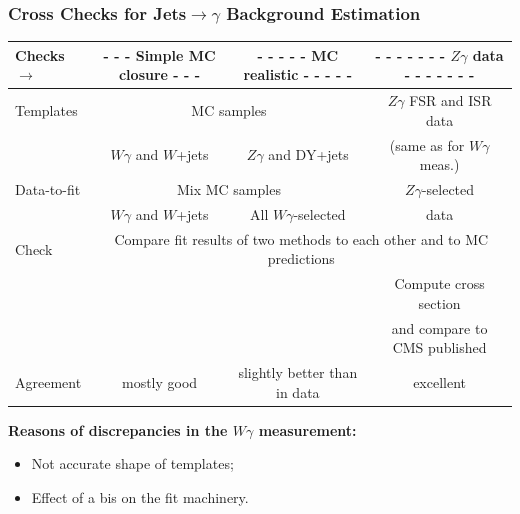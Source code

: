 \begin{frame}\frametitle {Cross Checks for Jets$\rightarrow\gamma$ Background Estimation}



\tiny

\begin{table}[h]
  \tiny
  \begin{center}
    \begin{tabular}{|l|c|c|c|}
      \hline
      Checks$\rightarrow$  & {\bfseries{- - - Simple MC closure - - -}} &  {\bfseries{- - - - - MC realistic - - - - -}}   & {\bfseries{- - - - - - - $Z\gamma$ data - - - - - - -}} \\ \hline

      Templates & \multicolumn{2}{|c|}{MC samples}                 &  $Z\gamma$ FSR and ISR data \\ 
                & $W\gamma$ and $W$+jets &  $Z\gamma$ and DY+jets  &  (same as for $W\gamma$ meas.) \\ \hline

      Data-to-fit & \multicolumn{2}{|c|}{Mix MC samples}   &  $Z\gamma$-selected  \\ 
                  & $W\gamma$ and $W$+jets  & All $W\gamma$-selected  &  data \\ \hline

      Check & \multicolumn{3}{|c|}{Compare fit results of two methods to each other and to MC predictions} \\
                                                       &  &   &  Compute cross section  \\ 
                                                      &  &   &  and compare to CMS published \\ \hline
      Agreement & mostly good & slightly better than in data &  excellent \\ \hline
    \end{tabular}
  \end{center}
\end{table} 

\footnotesize{\bfseries{Reasons of discrepancies in the $W\gamma$ measurement:  }}
\scriptsize
\begin{itemize}
  \item Not accurate shape of templates; 
  \item Effect of a bis on the fit machinery.
\end{itemize}

\end{frame}%
